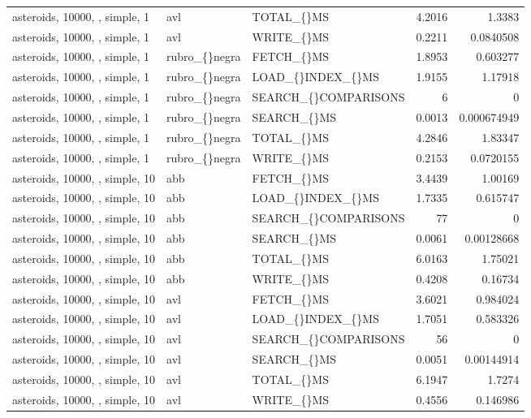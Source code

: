 \begin{longtable}{p{4cm}p{1.4cm}p{2.6cm}rr}
asteroids, 10000, , simple, 1 & avl & TOTAL\_\allowbreak\{\}MS & 4.2016 & 1.3383\\
asteroids, 10000, , simple, 1 & avl & WRITE\_\allowbreak\{\}MS & 0.2211 & 0.0840508\\
asteroids, 10000, , simple, 1 & rubro\_\allowbreak\{\}negra & FETCH\_\allowbreak\{\}MS & 1.8953 & 0.603277\\
asteroids, 10000, , simple, 1 & rubro\_\allowbreak\{\}negra & LOAD\_\allowbreak\{\}INDEX\_\allowbreak\{\}MS & 1.9155 & 1.17918\\
asteroids, 10000, , simple, 1 & rubro\_\allowbreak\{\}negra & SEARCH\_\allowbreak\{\}COMPARISONS & 6 & 0\\
asteroids, 10000, , simple, 1 & rubro\_\allowbreak\{\}negra & SEARCH\_\allowbreak\{\}MS & 0.0013 & 0.000674949\\
asteroids, 10000, , simple, 1 & rubro\_\allowbreak\{\}negra & TOTAL\_\allowbreak\{\}MS & 4.2846 & 1.83347\\
asteroids, 10000, , simple, 1 & rubro\_\allowbreak\{\}negra & WRITE\_\allowbreak\{\}MS & 0.2153 & 0.0720155\\
asteroids, 10000, , simple, 10 & abb & FETCH\_\allowbreak\{\}MS & 3.4439 & 1.00169\\
asteroids, 10000, , simple, 10 & abb & LOAD\_\allowbreak\{\}INDEX\_\allowbreak\{\}MS & 1.7335 & 0.615747\\
asteroids, 10000, , simple, 10 & abb & SEARCH\_\allowbreak\{\}COMPARISONS & 77 & 0\\
asteroids, 10000, , simple, 10 & abb & SEARCH\_\allowbreak\{\}MS & 0.0061 & 0.00128668\\
asteroids, 10000, , simple, 10 & abb & TOTAL\_\allowbreak\{\}MS & 6.0163 & 1.75021\\
asteroids, 10000, , simple, 10 & abb & WRITE\_\allowbreak\{\}MS & 0.4208 & 0.16734\\
asteroids, 10000, , simple, 10 & avl & FETCH\_\allowbreak\{\}MS & 3.6021 & 0.984024\\
asteroids, 10000, , simple, 10 & avl & LOAD\_\allowbreak\{\}INDEX\_\allowbreak\{\}MS & 1.7051 & 0.583326\\
asteroids, 10000, , simple, 10 & avl & SEARCH\_\allowbreak\{\}COMPARISONS & 56 & 0\\
asteroids, 10000, , simple, 10 & avl & SEARCH\_\allowbreak\{\}MS & 0.0051 & 0.00144914\\
asteroids, 10000, , simple, 10 & avl & TOTAL\_\allowbreak\{\}MS & 6.1947 & 1.7274\\
asteroids, 10000, , simple, 10 & avl & WRITE\_\allowbreak\{\}MS & 0.4556 & 0.146986\\

\end{longtable}
